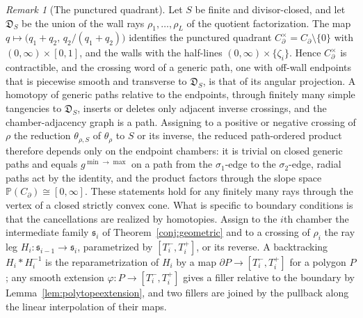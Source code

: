 \documentclass[11pt]{amsart}
\theoremstyle{definition}
\theoremstyle{remark}
\newtheorem{remark}[theorem]{Remark}
\newcommand{\Dscr}{\mathfrak{D}}
\begin{document}
\begin{remark}[The punctured quadrant]
\label{thm:positionobstruction7}
Let $S$ be finite and divisor-closed, and let $\Dscr_S$ be the union of the
wall rays $\rho_1,\dots,\rho_L$ of the quotient factorization.  The map
$q\mapsto\bigl(q_1+q_2,\,q_2/(q_1+q_2)\bigr)$ identifies the punctured
quadrant $C_\partial^\times=C_\partial\setminus\{0\}$ with
$(0,\infty)\times[0,1]$, and the walls with the half-lines
$(0,\infty)\times\{\zeta_i\}$.  Hence $C_\partial^\times$ is contractible, and
the crossing word of a generic path, one with off-wall endpoints that is
piecewise smooth and transverse to $\Dscr_S$, is that of its angular
projection.  A homotopy of generic paths relative to the endpoints, through
finitely many simple tangencies to $\Dscr_S$, inserts or deletes only adjacent
inverse crossings, and the chamber-adjacency graph is a path.  Assigning to a
positive or negative crossing of $\rho$ the reduction $\theta_{\rho,S}$ of
$\theta_\rho$ to $S$ or its inverse, the reduced path-ordered product therefore depends only on the endpoint chambers:
it is trivial on closed generic paths and equals $g^{\min\to\max}$ on a path
from the $\sigma_1$-edge to the $\sigma_2$-edge, radial paths act by the
identity, and the product factors through the slope space
$\mathbb P(C_\partial)\cong[0,\infty]$.  These statements hold for any finitely
many rays through the vertex of a closed strictly convex cone.  What is
specific to boundary conditions is that the cancellations are realized by
homotopies.  Assign to the $i$th chamber the intermediate family
$\mathfrak s_i$ of Theorem~\ref{conj:geometric} and to a crossing of $\rho_i$
the ray leg $H_i:\mathfrak s_{i-1}\to\mathfrak s_i$, parametrized by
$[T_i^-,T_i^+]$, or its reverse.  A backtracking $H_i*H_i^{-1}$ is the
reparametrization of $H_i$ by a map $\partial P\to[T_i^-,T_i^+]$ for a polygon
$P$; any smooth extension $\varphi:P\to[T_i^-,T_i^+]$ gives a filler relative
to the boundary by Lemma~\ref{lem:polytopeextension}, and two fillers are
joined by the pullback along the linear interpolation of their maps.
\end{remark}
\end{document}
